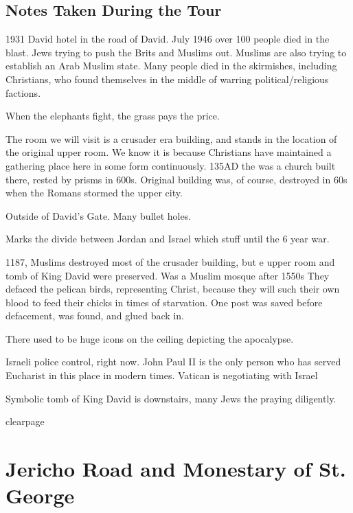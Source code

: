 \documentclass[letterpaper]{report}
\begin{document}
\subsection{Notes Taken During the Tour}
\begin{multicols}{2}
1931 David hotel in the road of David. July 1946 over 100 people died in the blast. Jews trying to push the Brits and Muslims out. Muslims are also trying to establish an Arab Muslim state. Many people died in the skirmishes, including Christians, who found themselves in the middle of warring political/religious factions.

When the elephants fight, the grass pays the price.

The room we will visit is a crusader era building, and stands in the location of the original upper room. We know it is because Christians have maintained a gathering place here in some form continuously.
135AD the was a church built there, rested by prisms in 600s.
Original building was, of course, destroyed in 60s when the Romans stormed the upper city.

Outside of David's Gate. Many bullet holes.

Marks the divide between Jordan and Israel which stuff until the 6 year war.

1187, Muslims destroyed most of the crusader building, but e upper room and tomb of King David were preserved.
Was a Muslim mosque after 1550s
They defaced the pelican birds, representing Christ, because they will such their own blood to feed their chicks in times of starvation.
One post was saved before defacement, was found, and glued back in.

There used to be huge icons on the ceiling depicting the apocalypse.

Israeli police control, right now.
John Paul II is the only person who has served Eucharist in this place in modern times. Vatican is negotiating with Israel

Symbolic tomb of King David is downstairs, many Jews the praying diligently.

\end{multicols}

clearpage
\section{Jericho Road and Monestary of
St. George}
\begin{multicols}{2}
	\mbox{}
\end{multicols}
\end{document}
